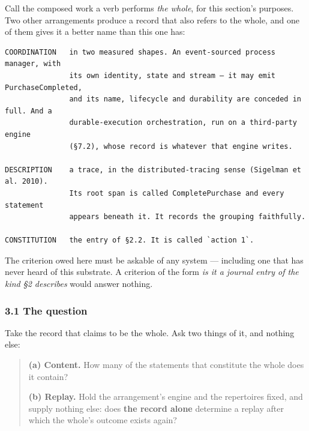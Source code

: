 \documentclass[
]{article}
\begin{document}
Call the composed work a verb performs \emph{the whole}, for this
section's purposes. Two other arrangements produce a record that also
refers to the whole, and one of them gives it a better name than this
one has:

\begin{verbatim}
COORDINATION   in two measured shapes. An event-sourced process manager, with
               its own identity, state and stream — it may emit PurchaseCompleted,
               and its name, lifecycle and durability are conceded in full. And a
               durable-execution orchestration, run on a third-party engine
               (§7.2), whose record is whatever that engine writes.

DESCRIPTION    a trace, in the distributed-tracing sense (Sigelman et al. 2010).
               Its root span is called CompletePurchase and every statement
               appears beneath it. It records the grouping faithfully.

CONSTITUTION   the entry of §2.2. It is called `action 1`.
\end{verbatim}

The criterion owed here must be askable of any system --- including one
that has never heard of this substrate. A criterion of the form \emph{is
it a journal entry of the kind §2 describes} would answer nothing.

\subsubsection{3.1 The question}\label{the-question}

Take the record that claims to be the whole. Ask two things of it, and
nothing else:

\begin{quote}
\textbf{(a) Content.} How many of the statements that constitute the
whole does it contain?

\textbf{(b) Replay.} Hold the arrangement's engine and the repertoires
fixed, and supply nothing else: does \textbf{the record alone} determine
a replay after which the whole's outcome exists again?
\end{quote}
\end{document}
